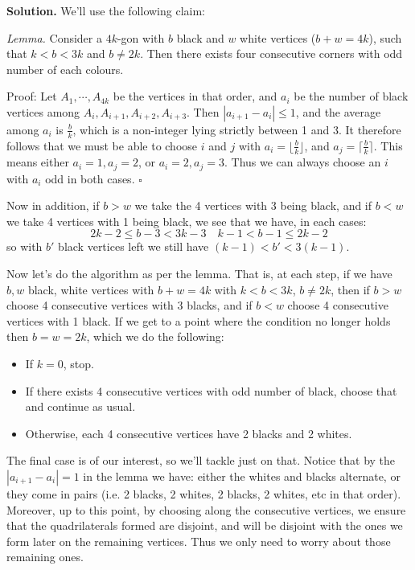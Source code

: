\documentclass[11pt,a4paper]{article}
\begin{document}
\begin{enumerate}
	\textbf{Solution.} 
	We'll use the following claim: 
	
	\emph{Lemma.} 
	Consider a $4k$-gon with $b$ black and $w$ white vertices ($b+w=4k$), 
	such that $k<b<3k$ and $b\neq 2k$. 
	Then there exists four consecutive corners with odd number of  each colours. 
	
	Proof: Let $A_1, \cdots, A_{4k}$ be the vertices in that order, and $a_i$ be the number of black vertices among $A_i, A_{i+1}, A_{i+2}, A_{i+3}$. 
	Then $|a_{i+1}-a_i|\le 1$, 
	and the average among $a_i$ is $\frac{b}{k}$, which is a non-integer lying strictly between 1 and 3. 
	It therefore follows that we must be able to choose $i$ and $j$ with $a_i=\lfloor \frac{b}{k}\rfloor$, 
	and $a_j=\lceil \frac{b}{k}\rceil$. 
	This means either $a_i=1, a_j=2$, or $a_i=2, a_j=3$. 
	Thus we can always choose an $i$ with $a_i$ odd in both cases. 
	$\square$
	
	Now in addition, if $b>w$ we take the 4 vertices with 3 being black, and if $b<w$ we take 4 vertices with 1 being black, 
	we see that we have, in each cases: 
	\[
	2k-2 \le b-3 < 3k - 3
	\quad 
	k - 1< b - 1\le 2k - 2
	\]
	so with $b'$ black vertices left we still have $(k-1)< b' < 3(k-1)$. 
	
	Now let's do the algorithm as per the lemma. 
	That is, at each step, 
	if we have $b, w$ black, white vertices with $b+w=4k$ with $k<b<3k$, $b\neq 2k$, 
	then if $b>w$ choose 4 consecutive vertices with 3 blacks, and if $b<w$ choose 4 consecutive vertices with 1 black. 
	If we get to a point where the condition no longer holds then $b=w=2k$, which we do the following: 
	\begin{itemize}
		\item If $k=0$, stop. 
		
		\item If there exists 4 consecutive vertices with odd number of black, choose that and continue as usual. 
		
		\item Otherwise, each 4 consecutive vertices have 2 blacks and 2 whites. 
	\end{itemize}
    The final case is of our interest, so we'll tackle just on that. Notice that by the $|a_{i+1}-a_i|=1$ in the lemma we have: 
    either the whites and blacks alternate, or they come in pairs (i.e. 2 blacks, 2 whites, 2 blacks, 2 whites, etc in that order). 
    Moreover, up to this point, by choosing along the consecutive vertices, we ensure that the quadrilaterals formed are disjoint, and will be disjoint with the ones we form later on the remaining vertices. 
    Thus we only need to worry about those remaining ones. 
    

\end{enumerate}
\end{document}
